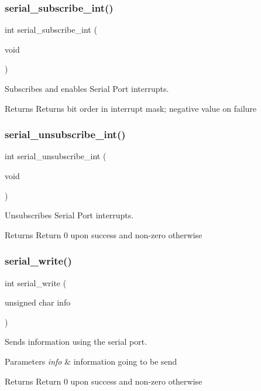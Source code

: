 \subsubsection{\texorpdfstring{serial\+\_\+subscribe\+\_\+int()}{serial\_subscribe\_int()}}
{\footnotesize\ttfamily int serial\+\_\+subscribe\+\_\+int (\begin{DoxyParamCaption}\item[{void}]{ }\end{DoxyParamCaption})}



Subscribes and enables Serial Port interrupts. 

\begin{DoxyReturn}{Returns}
Returns bit order in interrupt mask; negative value on failure 
\end{DoxyReturn}
\hypertarget{group___serial_ga56e227db9f0a79bfb5fd8a753d1be67a}{}\label{group___serial_ga56e227db9f0a79bfb5fd8a753d1be67a} 
\subsubsection{\texorpdfstring{serial\+\_\+unsubscribe\+\_\+int()}{serial\_unsubscribe\_int()}}
{\footnotesize\ttfamily int serial\+\_\+unsubscribe\+\_\+int (\begin{DoxyParamCaption}\item[{void}]{ }\end{DoxyParamCaption})}



Unsubscribes Serial Port interrupts. 

\begin{DoxyReturn}{Returns}
Return 0 upon success and non-\/zero otherwise 
\end{DoxyReturn}
\hypertarget{group___serial_ga62f6ef11a701d503d1ed5f4a873a1d2b}{}\label{group___serial_ga62f6ef11a701d503d1ed5f4a873a1d2b} 
\subsubsection{\texorpdfstring{serial\+\_\+write()}{serial\_write()}}
{\footnotesize\ttfamily int serial\+\_\+write (\begin{DoxyParamCaption}\item[{unsigned char}]{info }\end{DoxyParamCaption})}



Sends information using the serial port. 


\begin{DoxyParams}{Parameters}
{\em info} & information going to be send\\
\hline
\end{DoxyParams}
\begin{DoxyReturn}{Returns}
Return 0 upon success and non-\/zero otherwise 
\end{DoxyReturn}
